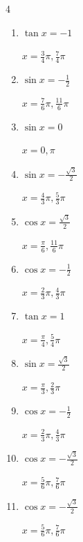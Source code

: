 \begin{multicols}{4}
\begin{enumerate}
        $\displaystyle x = \frac{\pi}{4} , \frac{7}{4}\pi$

  \item $\displaystyle \tan{x}  = -1$

        $\displaystyle x = \frac{3}{4}\pi , \frac{7}{4}\pi$

\columnbreak %

  \item $\displaystyle \sin{x}  = -\frac{1}{2}$

        $\displaystyle x = \frac{7}{6}\pi , \frac{11}{6}\pi$

  \item $\displaystyle \sin{x}  = 0$

        $\displaystyle x = 0 , \pi$

  \item $\displaystyle \sin{x}  = -\frac{\sqrt{3}}{2}$

        $\displaystyle x = \frac{4}{3}\pi , \frac{5}{3}\pi$

  \item $\displaystyle \cos{x}  = \frac{\sqrt{3}}{2}$

        $\displaystyle x = \frac{\pi}{6} , \frac{11}{6}\pi$

  \item $\displaystyle \cos{x}  = -\frac{1}{2}$

        $\displaystyle x = \frac{2}{3}\pi , \frac{4}{3}\pi$

  \item $\displaystyle \tan{x}  = 1$

        $\displaystyle x = \frac{\pi}{4} , \frac{5}{4}\pi$

  \item $\displaystyle \sin{x}  = \frac{\sqrt{3}}{2}$

        $\displaystyle x = \frac{\pi}{3} , \frac{2}{3}\pi$

  \item $\displaystyle \cos{x}  = -\frac{1}{2}$

        $\displaystyle x = \frac{2}{3}\pi , \frac{4}{3}\pi$

  \item $\displaystyle \cos{x}  = -\frac{\sqrt{3}}{2}$

        $\displaystyle x = \frac{5}{6}\pi , \frac{7}{6}\pi$

  \item $\displaystyle \cos{x}  = -\frac{\sqrt{3}}{2}$

        $\displaystyle x = \frac{5}{6}\pi , \frac{7}{6}\pi$


\end{enumerate}
\end{multicols}
